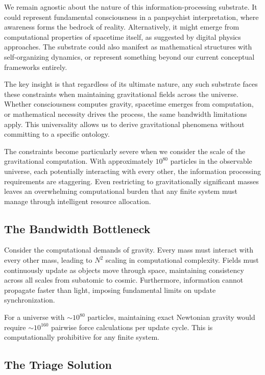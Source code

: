\documentclass[twocolumn,prd,amsmath,amssymb,aps,superscriptaddress,nofootinbib]{revtex4-2}
\begin{document}
We remain agnostic about the nature of this information-processing substrate. It could represent fundamental consciousness in a panpsychist interpretation, where awareness forms the bedrock of reality. Alternatively, it might emerge from computational properties of spacetime itself, as suggested by digital physics approaches. The substrate could also manifest as mathematical structures with self-organizing dynamics, or represent something beyond our current conceptual frameworks entirely.

The key insight is that regardless of its ultimate nature, any such substrate faces these constraints when maintaining gravitational fields across the universe. Whether consciousness computes gravity, spacetime emerges from computation, or mathematical necessity drives the process, the same bandwidth limitations apply. This universality allows us to derive gravitational phenomena without committing to a specific ontology.

The constraints become particularly severe when we consider the scale of the gravitational computation. With approximately $10^{80}$ particles in the observable universe, each potentially interacting with every other, the information processing requirements are staggering. Even restricting to gravitationally significant masses leaves an overwhelming computational burden that any finite system must manage through intelligent resource allocation.

\subsection{The Bandwidth Bottleneck}

Consider the computational demands of gravity. Every mass must interact with every other mass, leading to $N^2$ scaling in computational complexity. Fields must continuously update as objects move through space, maintaining consistency across all scales from subatomic to cosmic. Furthermore, information cannot propagate faster than light, imposing fundamental limits on update synchronization.

For a universe with $\sim 10^{80}$ particles, maintaining exact Newtonian gravity would require $\sim 10^{160}$ pairwise force calculations per update cycle. This is computationally prohibitive for any finite system.

\subsection{The Triage Solution}
\end{document}
